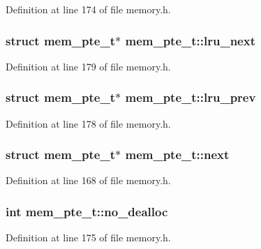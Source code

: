 Definition at line 174 of file memory.h.
\subsubsection[{lru\_\-next}]{\setlength{\rightskip}{0pt plus 5cm}struct {\bf mem\_\-pte\_\-t}$\ast$ {\bf mem\_\-pte\_\-t::lru\_\-next}\hspace{0.3cm}{\tt  [read]}}\label{structmem__pte__t_b011c18a9c76c2391f306933a3e3dbbb}




Definition at line 179 of file memory.h.
\subsubsection[{lru\_\-prev}]{\setlength{\rightskip}{0pt plus 5cm}struct {\bf mem\_\-pte\_\-t}$\ast$ {\bf mem\_\-pte\_\-t::lru\_\-prev}\hspace{0.3cm}{\tt  [read]}}\label{structmem__pte__t_dab8dd7565d221984493bd7cdd747ae5}




Definition at line 178 of file memory.h.
\subsubsection[{next}]{\setlength{\rightskip}{0pt plus 5cm}struct {\bf mem\_\-pte\_\-t}$\ast$ {\bf mem\_\-pte\_\-t::next}\hspace{0.3cm}{\tt  [read]}}\label{structmem__pte__t_0ca2bc018458d4bb14afc7b4ec99a628}




Definition at line 168 of file memory.h.
\subsubsection[{no\_\-dealloc}]{\setlength{\rightskip}{0pt plus 5cm}int {\bf mem\_\-pte\_\-t::no\_\-dealloc}}\label{structmem__pte__t_4458ee1f9d49f9d2f236ac02d1f9042d}




Definition at line 175 of file memory.h.
